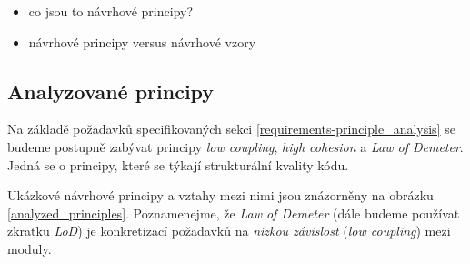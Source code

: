






\begin{itemize}
\item co jsou to návrhové principy?
\item návrhové principy versus návrhové vzory \cite{612257}
\end{itemize}

\subsection{Analyzované principy}
Na základě požadavků specifikovaných sekci \ref{requirements-principle_analysis} se budeme postupně zabývat principy \emph{low coupling}, \emph{high cohesion} a \emph{Law of Demeter}. Jedná se o principy, které se týkají strukturální kvality kódu.

Ukázkové návrhové principy a vztahy mezi nimi jsou znázorněny na obrázku \ref{analyzed_principles}. Poznamenejme, že \emph{Law of Demeter} (dále budeme používat zkratku \emph{LoD}) je konkretizací požadavků na \emph{nízkou závislost} (\emph{low coupling}) mezi moduly.

